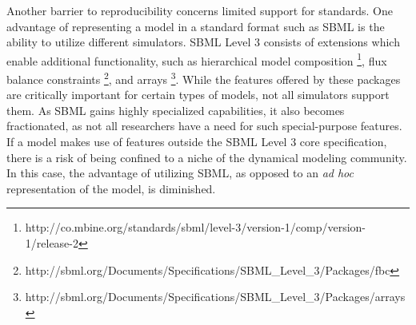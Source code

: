 \documentclass[journal,transmag,twoside]{IEEEtran}
\begin{document}
Another barrier to reproducibility concerns limited support for standards.
One advantage of representing a model in a standard format such as SBML is the ability
to utilize different simulators.
SBML Level 3 consists of extensions which enable additional
functionality, such as
hierarchical model composition \footnote{http://co.mbine.org/standards/sbml/level-3/version-1/comp/version-1/release-2},
flux balance constraints \footnote{ http://sbml.org/Documents/Specifications/SBML\_Level\_3/Packages/fbc}, and
arrays \footnote{http://sbml.org/Documents/Specifications/SBML\_Level\_3/Packages/arrays}.
While the features offered by these packages are critically important for certain
types of models, not all simulators support them.
As SBML gains highly specialized capabilities, it also becomes fractionated, as
not all researchers have a need for such special-purpose features.
If a model makes use of features outside the SBML Level 3 core specification,
there is a risk of being confined to a niche of the dynamical modeling community.
In this case, the advantage of utilizing SBML, as opposed to an \textit{ad hoc} representation
of the model, is diminished.




%
\end{document}
